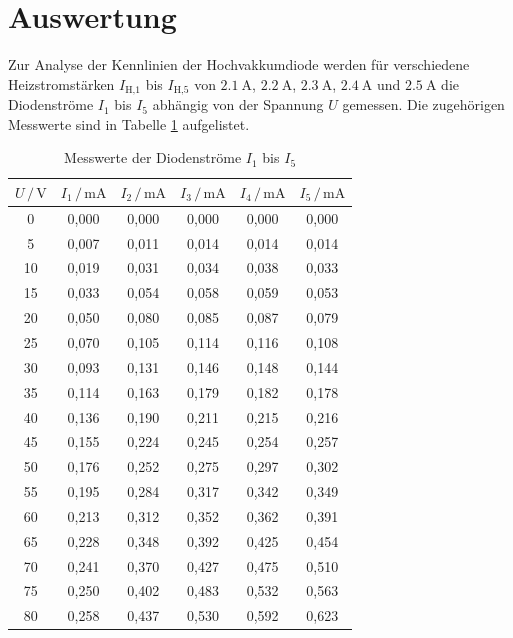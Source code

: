 \section{Auswertung}
\label{sec:Auswertung}

Zur Analyse der Kennlinien der Hochvakkumdiode werden für verschiedene Heizstromstärken
$I_\text{H,1}$ bis $I_\text{H,5}$ von $\SI{2.1}{\ampere}$, $\SI{2.2}{\ampere}$, $\SI{2.3}{\ampere}$, $\SI{2.4}{\ampere}$
und $\SI{2.5}{\ampere}$ die Diodenströme $I_1$ bis $I_5$ abhängig von der Spannung $U$ gemessen.
Die zugehörigen Messwerte sind in Tabelle \ref{tab:mess1} aufgelistet.

\begin{table}
  \footnotesize
  \centering
  \caption{Messwerte der Diodenströme $I_1$ bis $I_5$}
  \label{tab:mess1}
  \begin{tabular}{c c c c c c}
  \toprule
  $ U \,/\, \si{\volt} $ & $I_1 \,/\, \si{\milli\ampere}$ & $I_2 \,/\, \si{\milli\ampere}$
  & $I_3 \,/\, \si{\milli\ampere}$ & $I_4 \,/\, \si{\milli\ampere}$ 
  & $I_5 \,/\, \si{\milli\ampere}$ \\
  \midrule 
  0 & 0,000 & 0,000 & 0,000 & 0,000 & 0,000 \\
  5 & 0,007 & 0,011 & 0,014 & 0,014 & 0,014 \\
 10 & 0,019 & 0,031 & 0,034 & 0,038 & 0,033 \\
 15 & 0,033 & 0,054 & 0,058 & 0,059 & 0,053 \\
 20 & 0,050 & 0,080 & 0,085 & 0,087 & 0,079 \\
 25 & 0,070 & 0,105 & 0,114 & 0,116 & 0,108 \\
 30 & 0,093 & 0,131 & 0,146 & 0,148 & 0,144 \\
 35 & 0,114 & 0,163 & 0,179 & 0,182 & 0,178 \\
 40 & 0,136 & 0,190 & 0,211 & 0,215 & 0,216 \\
 45 & 0,155 & 0,224 & 0,245 & 0,254 & 0,257 \\
 50 & 0,176 & 0,252 & 0,275 & 0,297 & 0,302 \\
 55 & 0,195 & 0,284 & 0,317 & 0,342 & 0,349 \\
 60 & 0,213 & 0,312 & 0,352 & 0,362 & 0,391 \\
 65 & 0,228 & 0,348 & 0,392 & 0,425 & 0,454 \\
 70 & 0,241 & 0,370 & 0,427 & 0,475 & 0,510 \\
 75 & 0,250 & 0,402 & 0,483 & 0,532 & 0,563 \\
 80 & 0,258 & 0,437 & 0,530 & 0,592 & 0,623 \\

\end{tabular}
\end{table}
